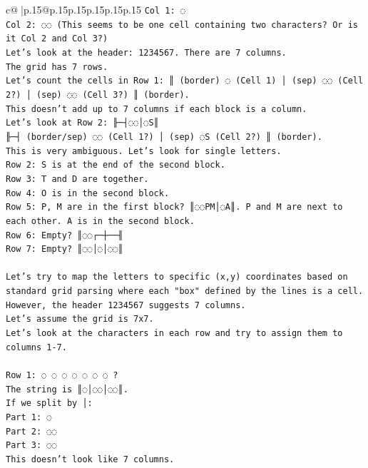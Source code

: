 \documentclass{article}
\begin{document}
{\begin{supertabular}{c@{$\;$}|p{.15\linewidth}@{}p{.15\linewidth}p{.15\linewidth}p{.15\linewidth}p{.15\linewidth}p{.15\linewidth}}
{{{\texttt{Col 1: ◌} \\
\texttt{Col 2: ◌◌ (This seems to be one cell containing two characters? Or is it Col 2 and Col 3?)} \\
\texttt{Let's look at the header: 1234567. There are 7 columns.} \\
\texttt{The grid has 7 rows.} \\
\texttt{Let's count the cells in Row 1: ║ (border) ◌ (Cell 1) │ (sep) ◌◌ (Cell 2?) │ (sep) ◌◌ (Cell 3?) ║ (border).} \\
\texttt{This doesn't add up to 7 columns if each block is a column.} \\
\texttt{Let's look at Row 2: ╟─┤◌◌│◌S║} \\
\texttt{╟─┤ (border/sep) ◌◌ (Cell 1?) │ (sep) ◌S (Cell 2?) ║ (border).} \\
\texttt{This is very ambiguous. Let's look for single letters.} \\
\texttt{Row 2: S is at the end of the second block.} \\
\texttt{Row 3: T and D are together.} \\
\texttt{Row 4: O is in the second block.} \\
\texttt{Row 5: P, M are in the first block? ║◌◌PM│◌A║. P and M are next to each other. A is in the second block.} \\
\texttt{Row 6: Empty? ║◌◌┌─┼──╢} \\
\texttt{Row 7: Empty? ║◌◌│◌│◌◌║} \\
\\ 
\texttt{Let's try to map the letters to specific (x,y) coordinates based on standard grid parsing where each "box" defined by the lines is a cell.} \\
\texttt{However, the header 1234567 suggests 7 columns.} \\
\texttt{Let's assume the grid is 7x7.} \\
\texttt{Let's look at the characters in each row and try to assign them to columns 1{-}7.} \\
\\ 
\texttt{Row 1: ◌ ◌ ◌ ◌ ◌ ◌ ◌ ?} \\
\texttt{The string is ║◌│◌◌│◌◌║.} \\
\texttt{If we split by │:} \\
\texttt{Part 1: ◌} \\
\texttt{Part 2: ◌◌} \\
\texttt{Part 3: ◌◌} \\
\texttt{This doesn't look like 7 columns.} \\
}}}
\end{supertabular}}
\end{document}
